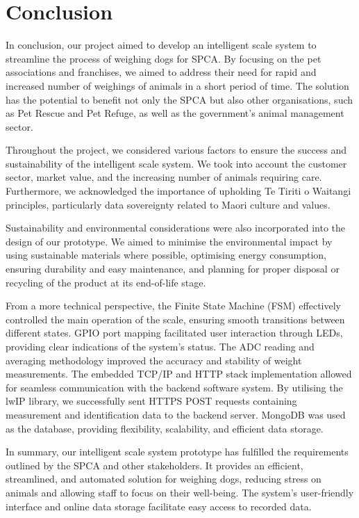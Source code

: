 
\chapter{Conclusion}

In conclusion, our project aimed to develop an intelligent scale system to streamline the process of weighing dogs for SPCA. By focusing on the pet associations and franchises, we aimed to address their need for rapid and increased number of weighings of animals in a short period of time. The solution has the potential to benefit not only the SPCA but also other organisations, such as Pet Rescue and Pet Refuge, as well as the government's animal management sector.

Throughout the project, we considered various factors to ensure the success and sustainability of the intelligent scale system. We took into account the customer sector, market value, and the increasing number of animals requiring care. Furthermore, we acknowledged the importance of upholding Te Tiriti o Waitangi principles, particularly data sovereignty related to Maori culture and values.

Sustainability and environmental considerations were also incorporated into the design of our prototype. We aimed to minimise the environmental impact by using sustainable materials where possible, optimising energy consumption, ensuring durability and easy maintenance, and planning for proper disposal or recycling of the product at its end-of-life stage.

From a more technical perspective, the Finite State Machine (FSM) effectively controlled the main operation of the scale, ensuring smooth transitions between different states. GPIO port mapping facilitated user interaction through LEDs, providing clear indications of the system's status. The ADC reading and averaging methodology improved the accuracy and stability of weight measurements. The embedded TCP/IP and HTTP stack implementation allowed for seamless communication with the backend software system. By utilising the lwIP library, we successfully sent HTTPS POST requests containing measurement and identification data to the backend server. MongoDB was used as the database, providing flexibility, scalability, and efficient data storage.

In summary, our intelligent scale system prototype has fulfilled the requirements outlined by the SPCA and other stakeholders. It provides an efficient, streamlined, and automated solution for weighing dogs, reducing stress on animals and allowing staff to focus on their well-being. The system's user-friendly interface and online data storage facilitate easy access to recorded data.

